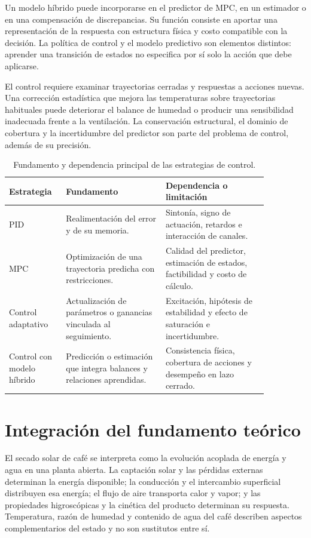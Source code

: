 Un modelo híbrido puede incorporarse en el predictor de MPC, en un estimador o en una compensación de discrepancias. Su función consiste en aportar una representación de la respuesta con estructura física y costo compatible con la decisión. La política de control y el modelo predictivo son elementos distintos: aprender una transición de estados no especifica por sí solo la acción que debe aplicarse.

El control requiere examinar trayectorias cerradas y respuestas a acciones nuevas. Una corrección estadística que mejora las temperaturas sobre trayectorias habituales puede deteriorar el balance de humedad o producir una sensibilidad inadecuada frente a la ventilación. La conservación estructural, el dominio de cobertura y la incertidumbre del predictor son parte del problema de control, además de su precisión.

\begin{table}[htbp]
\centering
\small
\caption{Fundamento y dependencia principal de las estrategias de control.}
\label{tab:comparacion_estrategias_control}
\begin{tabular}{p{0.17\linewidth}p{0.34\linewidth}p{0.35\linewidth}}
\toprule
Estrategia & Fundamento & Dependencia o limitación \\
\midrule
PID & Realimentación del error y de su memoria. & Sintonía, signo de actuación, retardos e interacción de canales. \\
MPC & Optimización de una trayectoria predicha con restricciones. & Calidad del predictor, estimación de estados, factibilidad y costo de cálculo. \\
Control adaptativo & Actualización de parámetros o ganancias vinculada al seguimiento. & Excitación, hipótesis de estabilidad y efecto de saturación e incertidumbre. \\
Control con modelo híbrido & Predicción o estimación que integra balances y relaciones aprendidas. & Consistencia física, cobertura de acciones y desempeño en lazo cerrado. \\
\bottomrule
\end{tabular}
\end{table}

\section{Integración del fundamento teórico}
\label{sec:marco_conceptual}

El secado solar de café se interpreta como la evolución acoplada de energía y agua en una planta abierta. La captación solar y las pérdidas externas determinan la energía disponible; la conducción y el intercambio superficial distribuyen esa energía; el flujo de aire transporta calor y vapor; y las propiedades higroscópicas y la cinética del producto determinan su respuesta. Temperatura, razón de humedad y contenido de agua del café describen aspectos complementarios del estado y no son sustitutos entre sí.

